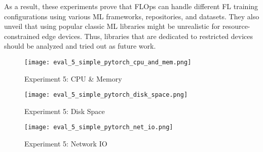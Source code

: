 As a result, these experiments prove that FLOps can handle different FL training configurations using various ML frameworks, repositories, and datasets.
They also unveil that using popular classic ML libraries might be unrealistic for resource-constrained edge devices.
Thus, libraries that are dedicated to restricted devices should be analyzed and tried out as future work.

\begin{figure}[H]
    \begin{adjustwidth}{-0.2\paperwidth}{-0.2\paperwidth}
        \centering
        \texttt{[image: eval\_5\_simple\_pytorch\_cpu\_and\_mem.png]}
        \caption{Experiment 5: CPU \& Memory}
        \label{fig:eval_5_cpu_mem}
    \end{adjustwidth}
\end{figure}

\begin{figure}[H]
    \begin{adjustwidth}{-0.2\paperwidth}{-0.2\paperwidth}
        \centering
        \texttt{[image: eval\_5\_simple\_pytorch\_disk\_space.png]}
        \caption{Experiment 5: Disk Space}
        \label{fig:eval_5_disk_space}
    \end{adjustwidth}
\end{figure}

\begin{figure}[H]
    \begin{adjustwidth}{-0.2\paperwidth}{-0.2\paperwidth}
        \centering
        \texttt{[image: eval\_5\_simple\_pytorch\_net\_io.png]}
        \caption{Experiment 5: Network IO}
        \label{fig:eval_5_net_io}
    \end{adjustwidth}
\end{figure}

